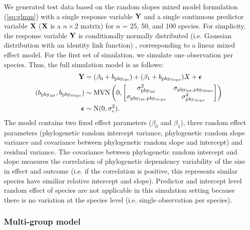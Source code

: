 \documentclass[12pt]{article}
\begin{document}
We generated test data based on the random slopes mixed model formulation (\ref{eq:glmm}) with a single response variable ${\mathbf Y}$ and a single continuous predictor variable ${\mathbf X}$ (${\mathbf X}$ is a $n \times 2$ matrix) for $n$ = 25, 50, and 100 species.
For simplicity, the response variable ${\mathbf Y}$ is conditionally normally distributed (i.e. Gaussian distribution with an identity link function) , corresponding to a linear mixed effect model. 
For the first set of simulation, we simulate one observation per species.
Thus, the full simulation model is as follows:
\begin{align}
{\mathbf Y} & = (\beta_0 + b_{\mathrm{phy_{int}}}) + (\beta_1 + b_{\mathrm{phy_{slope}}}) X + {\boldsymbol \epsilon}  \label{eq:ss_sim}\\\
(b_{\mathrm{phy_{int}}}, b_{\mathrm{phy_{slope}}}) & \sim \textrm{MVN} \left( 0, \begin{bmatrix}
\sigma^2_{\mathrm{phy_{int}}} & \sigma_{\mathrm{phy_{int},phy_{slope}}} \\ 
\sigma_{\mathrm{phy_{int},phy_{slope}}} & \sigma^2_{\mathrm{phy_{slope}}}
\end{bmatrix} 
\right) \\ 
{\boldsymbol \epsilon} & \sim \textrm{N} ( 0 , \sigma_{\epsilon}^2) .
\end{align}
The model contains two fixed effect parameters ($\beta_0$ and $\beta_1$), three random effect parameters (phylogenetic random intercept variance, phylogenetic random slope variance and covariance between phylogenetic random slope and intercept) and residual variance.  
The covariance between phylogenetic random intercept and slope measures the correlation of phylogenetic dependency variability of the size in effect and outcome (i.e. if the correlation is positive, this represents similar species have similiar relative intercept and slope).
Predictor and intercept level random effect of species are not applicable in this simulation setting because there is no variation at the species level (i.e. single observation per species).

\subsubsection*{Multi-group model}
\end{document}
